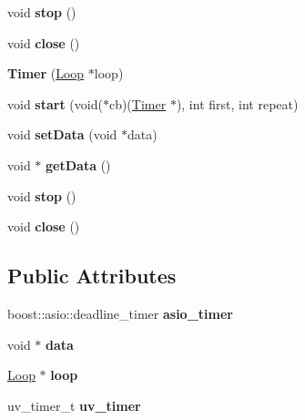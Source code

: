 \begin{DoxyCompactItemize}
void {\bfseries stop} ()
\item 
\mbox{\label{struct_timer_ab1b89acadd68bab394dd3fb757554267}} 
void {\bfseries close} ()
\item 
\mbox{\label{struct_timer_aafe8e3251652ea3482cf51d8c25520d1}} 
{\bfseries Timer} (\mbox{\hyperlink{struct_loop}{Loop}} $\ast$loop)
\item 
\mbox{\label{struct_timer_afc8820e12da3b47744a7a0dd4e69a88c}} 
void {\bfseries start} (void($\ast$cb)(\mbox{\hyperlink{struct_timer}{Timer}} $\ast$), int first, int repeat)
\item 
\mbox{\label{struct_timer_a965f0022acec271f4f5c9ca8a551f1ca}} 
void {\bfseries set\+Data} (void $\ast$data)
\item 
\mbox{\label{struct_timer_af2511d90de52aa58628721203dda5d7a}} 
void $\ast$ {\bfseries get\+Data} ()
\item 
\mbox{\label{struct_timer_a63f0eb44b27402196590a03781515dba}} 
void {\bfseries stop} ()
\item 
\mbox{\label{struct_timer_ab1b89acadd68bab394dd3fb757554267}} 
void {\bfseries close} ()
\end{DoxyCompactItemize}
\subsection*{Public Attributes}
\begin{DoxyCompactItemize}
\item 
\mbox{\label{struct_timer_a8c0fbd0dd0e0809ce7c4bcc6a94b9d4b}} 
boost\+::asio\+::deadline\+\_\+timer {\bfseries asio\+\_\+timer}
\item 
\mbox{\label{struct_timer_a37c24f57ceb84389ede5d5ba6a2d4c47}} 
void $\ast$ {\bfseries data}
\item 
\mbox{\label{struct_timer_ae1f39d44d02da03cb506420f2bf0095d}} 
\mbox{\hyperlink{struct_loop}{Loop}} $\ast$ {\bfseries loop}
\item 
\mbox{\label{struct_timer_a08bb535eea66cb8d58d705e3ea68353a}} 
uv\+\_\+timer\+\_\+t {\bfseries uv\+\_\+timer}
\end{DoxyCompactItemize}


